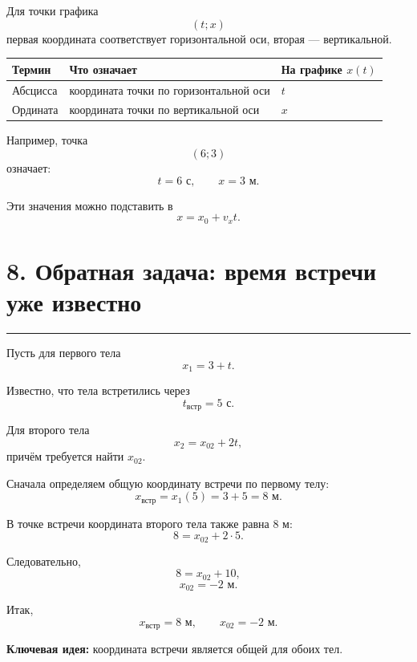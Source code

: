 \documentclass[a4paper,12pt]{article}
\newcommand{\sectionline}{%
    \vspace{-0.4em}
    {\color{accent}\rule{\linewidth}{0.7pt}}
    \vspace{0.4em}
}
\newcommand{\key}[1]{\textbf{\color{darkaccent}#1}}
\begin{document}
Для точки графика
\[
(t;x)
\]
первая координата соответствует горизонтальной оси, вторая --- вертикальной.

\begin{center}
\renewcommand{\arraystretch}{1.35}
\begin{tabularx}{0.9\linewidth}{@{}lXl@{}}
\toprule
\textbf{Термин} & \textbf{Что означает} & \textbf{На графике \(x(t)\)} \\
\midrule
Абсцисса &
координата точки по горизонтальной оси &
\(t\) \\
Ордината &
координата точки по вертикальной оси &
\(x\) \\
\bottomrule
\end{tabularx}
\end{center}

Например, точка
\[
(6;3)
\]
означает:
\[
t=6\text{ с},
\qquad
x=3\text{ м}.
\]

Эти значения можно подставить в
\[
x=x_0+v_xt.
\]


\section*{\color{darkaccent}8. Обратная задача: время встречи уже известно}
\sectionline

Пусть для первого тела
\[
x_1=3+t.
\]

Известно, что тела встретились через
\[
t_{\text{встр}}=5\text{ с}.
\]

Для второго тела
\[
x_2=x_{02}+2t,
\]
причём требуется найти \(x_{02}\).

Сначала определяем общую координату встречи по первому телу:
\[
x_{\text{встр}}
=
x_1(5)
=
3+5
=
8\text{ м}.
\]

В точке встречи координата второго тела также равна \(8\) м:
\[
8=x_{02}+2\cdot5.
\]

Следовательно,
\[
8=x_{02}+10,
\]
\[
\boxed{x_{02}=-2\text{ м}}.
\]

Итак,
\[
\boxed{x_{\text{встр}}=8\text{ м}},
\qquad
\boxed{x_{02}=-2\text{ м}}.
\]

\key{Ключевая идея:} координата встречи является общей для обоих тел.

\end{document}
